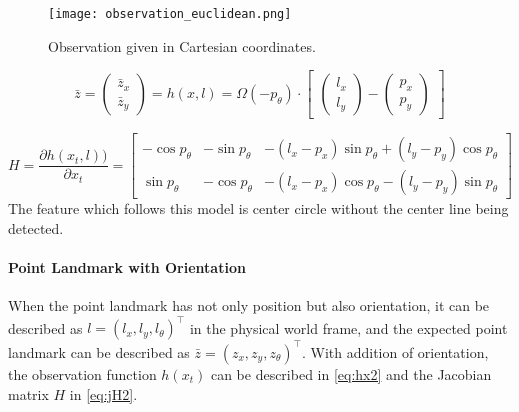 \begin{figure}[h!]
  \centering
  \texttt{[image: observation\_euclidean.png]}
  \caption[Observation given in Cartesian coordinates.]{Observation given in Cartesian coordinates. \cite{Tasse2013}}
  \label{fig:observation_euclidean}
\end{figure}

\begin{equation}\label{eq:hx}
  \bar{z} = \begin{pmatrix}
\bar{z}_{x}\\ 
\bar{z}_{y}
\end{pmatrix}
= 
h(x, l)
=
\Omega(-p_{\theta})
\cdot
\begin{bmatrix}
 \begin{pmatrix}
l_{x}\\ 
l_{y}
\end{pmatrix}
-
\begin{pmatrix}
p_{x}\\ 
p_{y}
\end{pmatrix}
\end{bmatrix}
\end{equation}

\begin{equation}\label{eq:jH}
H =
\frac{\partial h(x_t,l))}{\partial x_t}
=
\begin{bmatrix}
  -\cos{p_{\theta}} & -\sin{p_{\theta}} & -(l_x-p_x)\sin{p_{\theta}} + (l_y-p_y)\cos{p_{\theta}} \\ 
  \sin{p_{\theta}} & -\cos{p_{\theta}} & -(l_x-p_x)\cos{p_{\theta}} - (l_y-p_y)\sin{p_{\theta}} 
\end{bmatrix}
\end{equation}
The feature which follows this model is center circle without the center line being detected.

\paragraph{Point Landmark with Orientation}\label{par:pointLandmark}
When the point landmark has not only position but also orientation, it can be described as $l = (l_x, l_y, l_{\theta})^\top$ in the physical world frame, and the expected point landmark can be described as $\bar{z} = (z_x, z_y, z_{\theta})^\top$.  With addition of orientation, the observation function $h(x_t)$ can be described in \autoref{eq:hx2} and the Jacobian matrix $H$ in \autoref{eq:jH2}.

